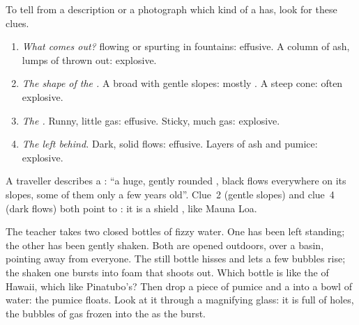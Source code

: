 \begin{method}\label{met:g7:volcanoes:clues}
To tell from a description or a photograph which kind of  a 
has, look for these clues.
\begin{enumerate}
  \item \emph{What comes out?}  flowing or spurting in fountains:
        effusive. A column of ash, lumps of  thrown out: explosive.
  \item \emph{The shape of the .} A broad  with gentle
        slopes: mostly . A steep cone: often explosive.
  \item \emph{The .} Runny, little gas: effusive. Sticky, much gas:
        explosive.
  \item \emph{The  left behind.} Dark, solid  flows: effusive.
        Layers of ash and pumice: explosive.
\end{enumerate}
\end{method}

\begin{example}\label{ex:g7:volcanoes:clues}
A traveller describes a : ``a huge, gently rounded , black
 flows everywhere on its slopes, some of them only a few years old''.
Clue~2 (gentle slopes) and clue~4 (dark  flows) both point to : it is a shield , like Mauna Loa.
\end{example}

\begin{inthelab}
The teacher takes two closed bottles of fizzy water. One has been left
standing; the other has been gently shaken. Both are opened outdoors, over
a basin, pointing away from everyone. The still bottle hisses and lets a
few bubbles rise; the shaken one bursts into foam that shoots out. Which
bottle is like the  of Hawaii, which like Pinatubo's? Then drop a
piece of pumice and a  into a bowl of water: the pumice floats. Look
at it through a magnifying glass: it is full of holes, the bubbles of gas
frozen into the  as the  burst.
\end{inthelab}

